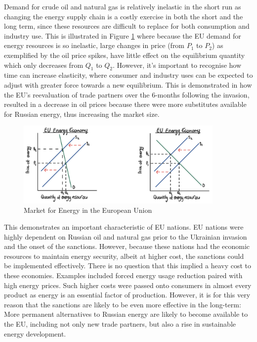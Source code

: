 \documentclass[12pt]{article}
\begin{document}
Demand for crude oil and natural gas is relatively inelastic in the short run as changing the energy supply chain is a costly exercise in both the short and the long term, since these resources are difficult to replace for both consumption and industry use. This is illustrated in Figure \ref{fig:inelast} where because the EU demand for energy resources is so inelastic, large changes in price (from $P_1$ to $P_2$) as exemplified by the oil price spikes, have little effect on the equilibrium quantity which only decreases from $Q_1$ to $Q_2$. However, it's important to recognise how time can increase elasticity, where consumer and industry uses can be expected to adjust with greater force towards a new equilibrium. This is demonstrated in how the EU's reevaluation of trade partners over the 6-months following the invasion, resulted in a decrease in oil prices because there were more substitutes available for Russian energy, thus increasing the market size.  

\begin{figure}[h]
    \centering
    \includegraphics[width=0.9\textwidth]{images/a inelast.jpg}
    \caption{Market for Energy in the European Union}
    \label{fig:inelast}
\end{figure}

This demonstrates an important characteristic of EU nations. EU nations were highly dependent on Russian oil and natural gas prior to the Ukrainian invasion and the onset of the sanctions. However, because these nations had the economic resources to maintain energy security, albeit at higher cost, the sanctions could be implemented effectively. There is no question that this implied a heavy cost to these economies. Examples included forced energy usage reduction paired with high energy prices. Such higher costs were passed onto consumers in almost every product as energy is an essential factor of production. However, it is for this very reason that the sanctions are likely to be even more effective in the long-term: More permanent alternatives to Russian energy are likely to become available to the EU, including not only new trade partners, but also a rise in sustainable energy development. 
\end{document}
